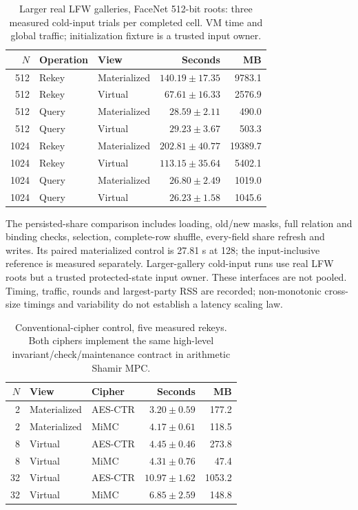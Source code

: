 \begin{table}[t]
\caption{Larger real LFW galleries, FaceNet 512-bit roots: three measured cold-input trials per completed cell. VM time and global traffic; initialization fixture is a trusted input owner.}
\label{tab:v3scale}\centering\small
\setlength{\tabcolsep}{3pt}
\begin{tabular}{rllrr}
\toprule
$N$ & Operation & View & Seconds & MB \\
\midrule
512 & Rekey & Materialized & $140.19\pm17.35$ & 9783.1 \\
512 & Rekey & Virtual & $67.61\pm16.33$ & 2576.9 \\
512 & Query & Materialized & $28.59\pm2.11$ & 490.0 \\
512 & Query & Virtual & $29.23\pm3.67$ & 503.3 \\
1024 & Rekey & Materialized & $202.81\pm40.77$ & 19389.7 \\
1024 & Rekey & Virtual & $113.15\pm35.64$ & 5402.1 \\
1024 & Query & Materialized & $26.80\pm2.49$ & 1019.0 \\
1024 & Query & Virtual & $26.23\pm1.58$ & 1045.6 \\
\bottomrule
\end{tabular}
\end{table}

The persisted-share comparison includes loading, old/new masks, full relation and binding checks, selection, complete-row shuffle, every-field share refresh and writes. Its paired materialized control is 27.81 s at 128; the input-inclusive reference is measured separately. Larger-gallery cold-input runs use real LFW roots but a trusted protected-state input owner. These interfaces are not pooled. Timing, traffic, rounds and largest-party RSS are recorded; non-monotonic cross-size timings and variability do not establish a latency scaling law.

\begin{table}[t]
\caption{Conventional-cipher control, five measured rekeys. Both ciphers implement the same high-level invariant/check/maintenance contract in arithmetic Shamir MPC.}
\label{tab:v3cipher}\centering\small
\setlength{\tabcolsep}{3pt}
\begin{tabular}{rllrr}
\toprule
$N$ & View & Cipher & Seconds & MB \\
\midrule
2 & Materialized & AES-CTR & $3.20\pm0.59$ & 177.2 \\
2 & Materialized & MiMC & $4.17\pm0.61$ & 118.5 \\
8 & Virtual & AES-CTR & $4.45\pm0.46$ & 273.8 \\
8 & Virtual & MiMC & $4.31\pm0.76$ & 47.4 \\
32 & Virtual & AES-CTR & $10.97\pm1.62$ & 1053.2 \\
32 & Virtual & MiMC & $6.85\pm2.59$ & 148.8 \\
\bottomrule
\end{tabular}
\end{table}

